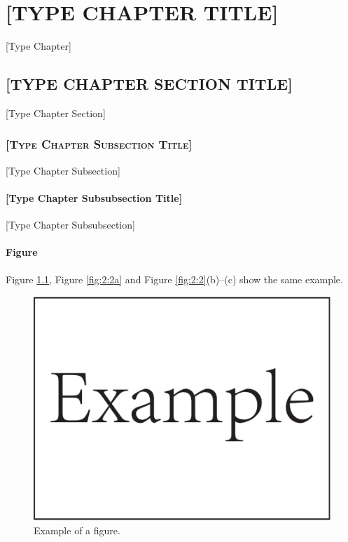 \chapter{\uppercase{[Type Chapter Title]}}
[Type Chapter]
\section{\uppercase{[Type Chapter Section Title]}}
[Type Chapter Section]
\subsection{\textsc{[Type Chapter Subsection Title]}}
[Type Chapter Subsection]
\subsubsection{[Type Chapter Subsubsection Title]}
[Type Chapter Subsubsection]
\subsubsection{Figure}
Figure \ref{fig:2:1}, Figure \ref{fig:2:2a} and Figure \ref{fig:2:2}(b)--(c) show the same example.

\begin{figure}[!htb]
	\centering
	\includegraphics[width=0.9\linewidth]{Figures/Example}
	\caption{Example of a figure.}
	\label{fig:2:1}
\end{figure}

